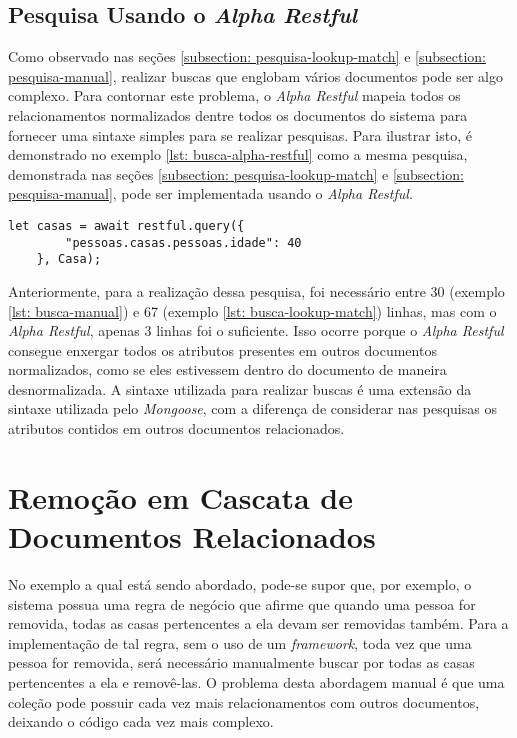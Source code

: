 \subsection{Pesquisa Usando o \textit{Alpha Restful}\label{subsection: pesquisa-usando-alpha-restful}}

Como observado nas seções \ref{subsection: pesquisa-lookup-match} e \ref{subsection: pesquisa-manual}, realizar buscas que englobam vários documentos pode ser algo complexo. Para contornar este problema, o \textit{Alpha Restful} mapeia todos os relacionamentos normalizados dentre todos os documentos do sistema para fornecer uma sintaxe simples para se realizar pesquisas. Para ilustrar isto, é demonstrado no exemplo \ref{lst: busca-alpha-restful} como a mesma pesquisa, demonstrada nas seções \ref{subsection: pesquisa-lookup-match} e \ref{subsection: pesquisa-manual}, pode ser implementada usando o \textit{Alpha Restful}.
    
\begin{lstlisting}[style=ES6, caption={Busca em Dados Normalizados com o \textit{Alpha Restful}\label{lst: busca-alpha-restful}}]
    let casas = await restful.query({
        "pessoas.casas.pessoas.idade": 40
    }, Casa);
\end{lstlisting}
    
Anteriormente, para a realização dessa pesquisa, foi necessário entre 30 (exemplo \ref{lst: busca-manual}) e 67 (exemplo \ref{lst: busca-lookup-match}) linhas, mas com o \textit{Alpha Restful}, apenas 3 linhas foi o suficiente. Isso ocorre porque o \textit{Alpha Restful} consegue enxergar todos os atributos presentes em outros documentos normalizados, como se eles estivessem dentro do documento de maneira desnormalizada. A sintaxe utilizada para realizar buscas é uma extensão da sintaxe utilizada pelo \textit{Mongoose}, com a diferença de considerar nas pesquisas os atributos contidos em outros documentos relacionados.

\section{Remoção em Cascata de Documentos Relacionados\label{section: remocao-cascata-documentos-relacionados}}
    
No exemplo a qual está sendo abordado, pode-se supor que, por exemplo, o sistema possua uma regra de negócio que afirme que quando uma pessoa for removida, todas as casas pertencentes a ela devam ser removidas também. Para a implementação de tal regra, sem o uso de um \textit{framework}, toda vez que uma pessoa for removida, será necessário manualmente buscar por todas as casas pertencentes a ela e removê-las. O problema desta abordagem manual é que uma coleção pode possuir cada vez mais relacionamentos com outros documentos, deixando o código cada vez mais complexo.

